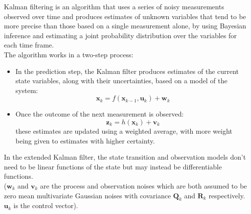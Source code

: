 Kalman filtering is an algorithm that uses a series of noisy measurements observed over time and produces estimates of unknown variables that tend to be more precise than those based on a single measurement alone, by using Bayesian inference and estimating a joint probability distribution over the variables for each time frame.\\
The algorithm works in a two-step process:
\begin{itemize}
\item In the prediction step, the Kalman filter produces estimates of the current state variables, along with their uncertainties, based on a model of the system:
\begin{equation}
\boldsymbol{x}_k = f(\boldsymbol{x}_{k-1},\boldsymbol{u}_k) + \boldsymbol{w}_k
\end{equation}
\item Once the outcome of the next measurement is observed:
\begin{equation}
\boldsymbol{z}_k = h(\boldsymbol{x}_{k}) + \boldsymbol{v}_k
\end{equation}
these estimates are updated using a weighted average, with more weight being given to estimates with higher certainty.
\end{itemize}
In the extended Kalman filter, the state transition and observation models don't need to be linear functions of the state but may instead be differentiable functions.\\
($\boldsymbol{w}_k$ and $\boldsymbol{v}_k$ are the process and observation noises which are both assumed to be zero mean multivariate Gaussian noises with covariance $\boldsymbol{Q}_k$ and $\boldsymbol{R}_k$ respectively. $\boldsymbol{u}_k$ is the control vector).

